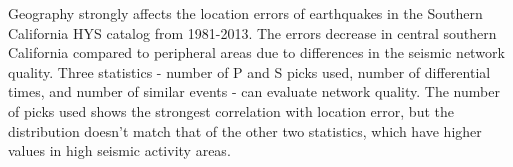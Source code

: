 \documentclass[12pt]{article} %
\theoremstyle{plain}
\begin{document}
	
	
	Geography strongly affects the location errors of earthquakes in the Southern California HYS catalog from 1981-2013. The errors decrease in central southern California compared to peripheral areas due to differences in the seismic network quality. Three statistics - number of P and S picks used, number of differential times, and number of similar events - can evaluate network quality. The number of picks used shows the strongest correlation with location error, but the distribution doesn't match that of the other two statistics, which have higher values in high seismic activity areas.
	
\end{document}
